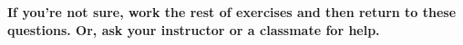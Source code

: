 \item[~] \textbf{If you're not sure, work the rest of exercises and then return to these questions.  Or, ask your instructor or a classmate for help.}